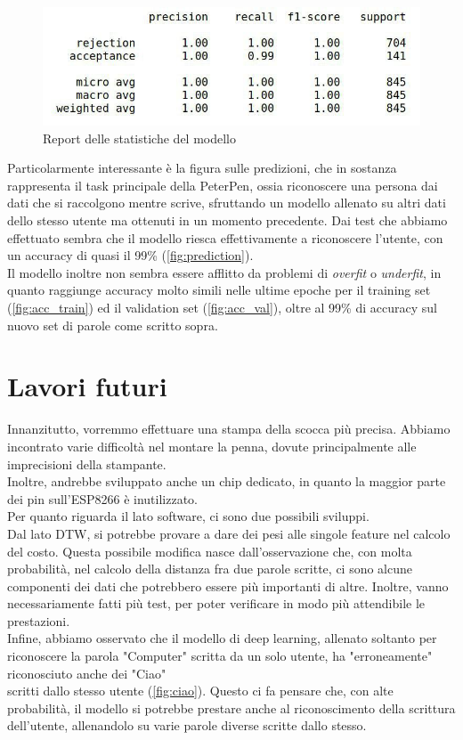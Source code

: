 \documentclass[8pt,notitlepage]{report}
\begin{document}
			\begin{figure}[H]
				\begin{center}
					\includegraphics[scale=.4]{measures_table_LSTM}
					\caption{Report delle statistiche del modello}
				\end{center}
			\end{figure}
			\newpage
			Particolarmente interessante è la figura sulle predizioni, che in sostanza rappresenta il task principale della PeterPen, ossia riconoscere una persona dai dati che si raccolgono mentre scrive, sfruttando un modello allenato su altri dati dello stesso utente ma ottenuti in un momento precedente. Dai test che abbiamo effettuato sembra che il modello riesca effettivamente a riconoscere l'utente, con un accuracy di quasi il 99\% (\cref{fig:prediction}). \\
			Il modello inoltre non sembra essere afflitto da problemi di \textit{overfit} o \textit{underfit}, in quanto raggiunge accuracy molto simili nelle ultime epoche per il training set (\cref{fig:acc_train}) ed il validation set (\cref{fig:acc_val}), oltre al 99\% di accuracy sul nuovo set di parole come scritto sopra. \\


\chapter{Lavori futuri}

	Innanzitutto, vorremmo effettuare una stampa della scocca più precisa. Abbiamo incontrato varie difficoltà nel montare la penna, dovute principalmente alle imprecisioni della stampante. \\
	Inoltre, andrebbe sviluppato anche un chip dedicato, in quanto la maggior parte dei pin sull'ESP8266 è inutilizzato. \\
	Per quanto riguarda il lato software, ci sono due possibili sviluppi. 
	\\ Dal lato DTW, si potrebbe provare a dare dei pesi alle singole feature nel calcolo del costo. Questa possibile modifica nasce dall'osservazione che, con molta probabilità, nel calcolo della distanza fra due parole scritte, ci sono alcune componenti dei dati che potrebbero essere più importanti di altre. Inoltre, vanno necessariamente fatti più test, per poter verificare in modo più attendibile le prestazioni.
	\\ Infine, abbiamo osservato che il modello di deep learning, allenato soltanto per riconoscere la parola "Computer" scritta da un solo utente, ha "erroneamente" riconosciuto anche dei "Ciao" \\ scritti dallo stesso utente (\cref{fig:ciao}). Questo ci fa pensare che, con alte probabilità, il modello si potrebbe prestare anche al riconoscimento della scrittura dell'utente, allenandolo su varie parole diverse scritte dallo stesso.
	
\end{document}
